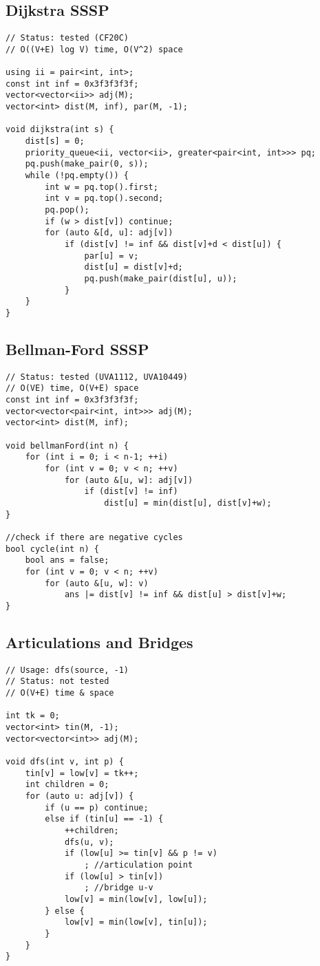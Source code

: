 \documentclass[12pt, a4paper, twoside]{article}
\begin{document}
\subsection{Dijkstra SSSP}
\begin{lstlisting}
// Status: tested (CF20C)
// O((V+E) log V) time, O(V^2) space

using ii = pair<int, int>;
const int inf = 0x3f3f3f3f;
vector<vector<ii>> adj(M);
vector<int> dist(M, inf), par(M, -1);

void dijkstra(int s) {
	dist[s] = 0;
	priority_queue<ii, vector<ii>, greater<pair<int, int>>> pq;
	pq.push(make_pair(0, s));
	while (!pq.empty()) {
		int w = pq.top().first;
		int v = pq.top().second;
		pq.pop();
		if (w > dist[v]) continue;
		for (auto &[d, u]: adj[v])
			if (dist[v] != inf && dist[v]+d < dist[u]) {
				par[u] = v;
				dist[u] = dist[v]+d;
				pq.push(make_pair(dist[u], u));
			}
	}
}
\end{lstlisting}

\subsection{Bellman-Ford SSSP}
\begin{lstlisting}
// Status: tested (UVA1112, UVA10449)
// O(VE) time, O(V+E) space
const int inf = 0x3f3f3f3f;
vector<vector<pair<int, int>>> adj(M);
vector<int> dist(M, inf);

void bellmanFord(int n) {
	for (int i = 0; i < n-1; ++i)
		for (int v = 0; v < n; ++v)
			for (auto &[u, w]: adj[v])
				if (dist[v] != inf)
					dist[u] = min(dist[u], dist[v]+w);
}

//check if there are negative cycles
bool cycle(int n) {
	bool ans = false;
	for (int v = 0; v < n; ++v)
		for (auto &[u, w]: v)
			ans |= dist[v] != inf && dist[u] > dist[v]+w;
}
\end{lstlisting}

\subsection{Articulations and Bridges}
\begin{lstlisting}
// Usage: dfs(source, -1)
// Status: not tested
// O(V+E) time & space

int tk = 0;
vector<int> tin(M, -1);
vector<vector<int>> adj(M);

void dfs(int v, int p) {
	tin[v] = low[v] = tk++;
	int children = 0;
	for (auto u: adj[v]) {
		if (u == p) continue;
		else if	(tin[u] == -1) {
			++children;
			dfs(u, v);
			if (low[u] >= tin[v] && p != v)
				; //articulation point
			if (low[u] > tin[v])
				; //bridge u-v
			low[v] = min(low[v], low[u]);
		} else {
			low[v] = min(low[v], tin[u]);
		}
	}
}
\end{lstlisting}
\end{document}
